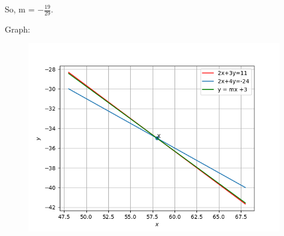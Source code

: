 \documentclass{beamer}
\numberwithin{equation}{section}
\begin{document}
		So, m = $-\frac{19}{29}$.


Graph:
\begin{figure}[h!]
	\centering
	\includegraphics[width=\linewidth]{img.png}
\end{figure}	
\end{document}
